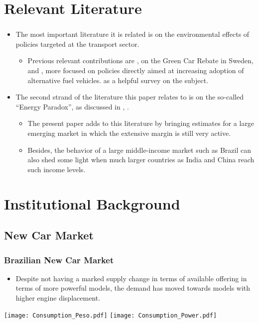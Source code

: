 \documentclass{beamer}
\begin{document}
\section{Relevant Literature}
\begin{frame}[fragile]\frametitle{\insertsection}
    \begin{itemize}
        \item The most important literature it is related is on the environmental effects of policies targeted at the transport sector. 
        \begin{itemize}
            \item Previous relevant contributions are \citet{Huse2014}, on the Green Car Rebate in Sweden, \citet{Chandra2010} and \citet{Berestenau2011}, more focused on policies directly aimed at increasing adoption of alternative fuel vehicles. \citet{Anderson-Sallee2016} as a helpful survey on the subject.
        \end{itemize}
        
        \item The second strand of the literature this paper relates to is on the so-called ``Energy Paradox'', as discussed in \citet{Allcott2014}, \citet{Sallee2015a}.
        \begin{itemize}
            \item The present paper adds to this literature by bringing estimates for a large emerging market in which the extensive margin is still very active. 
            \item Besides, the behavior of a large middle-income market such as Brazil can also shed some light when much larger countries as India and China reach such income levels. 

        \end{itemize}
         
    \end{itemize}


\end{frame}


\section{Institutional Background}

\subsection{New Car Market}

\begin{frame}[fragile]\frametitle{Brazilian New Car Market}

\begin{itemize}
    \item Despite not having a marked supply change in terms of available offering in terms of more powerful models, the demand has moved towards models with higher engine displacement.
\end{itemize}

\texttt{[image: Consumption\_Peso.pdf]}%
\texttt{[image: Consumption\_Power.pdf]}
    


\end{frame}
\end{document}
